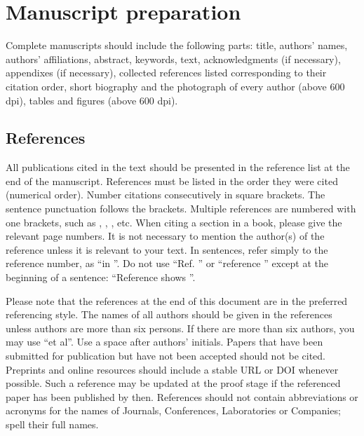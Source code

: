 \documentclass[journal,a4paper]{IEEEtran}
\begin{document}
\section{Manuscript preparation}

Complete manuscripts should include the following parts: title, authors' names, authors' affiliations, abstract, keywords, text, acknowledgments (if necessary), appendixes (if necessary), collected references listed corresponding to their citation order, short biography and the photograph of every author (above 600 dpi), tables and figures (above 600 dpi).

\subsection{References}

All publications cited in the text should be presented in the reference list at the end of the manuscript. References must be listed in the order they were cited (numerical order). Number citations consecutively in square brackets\cite{lecun2015deep}. The sentence punctuation follows the brackets\cite{vaswani2017attention}. Multiple references \cite{vaswani2017attention,he2016deep} are numbered with one brackets, such as \cite{lecun2015deep,vaswani2017attention,he2016deep}, \cite{vaswani2017attention,he2016deep}, \nocite{bishop2006pattern}\cite{he2016deep,radford2021learning,deng2009imagenet,mnih2015human}, etc. When citing a section in a book, please give the relevant page numbers\cite{bishop2006pattern}. It is not necessary to mention the author(s) of the reference unless it is relevant to your text. In sentences, refer simply to the reference number, as ``in \cite{radford2021learning}''. Do not use ``Ref. \cite{radford2021learning}'' or ``reference \cite{radford2021learning}'' except at the beginning of a sentence: ``Reference \cite{radford2021learning} shows \textellipsis''.

Please note that the references at the end of this document are in the preferred referencing style. The names of all authors should be given in the references unless authors are more than six persons. If there are more than six authors, you may use ``et al''. Use a space after authors' initials. Papers that have been submitted for publication but have not been accepted should not be cited. Preprints and online resources should include a stable URL or DOI whenever possible\cite{kingma2015adam}. Such a reference may be updated at the proof stage if the referenced paper has been published by then. References should not contain abbreviations or acronyms for the names of Journals, Conferences, Laboratories or Companies; spell their full names.
\end{document}
